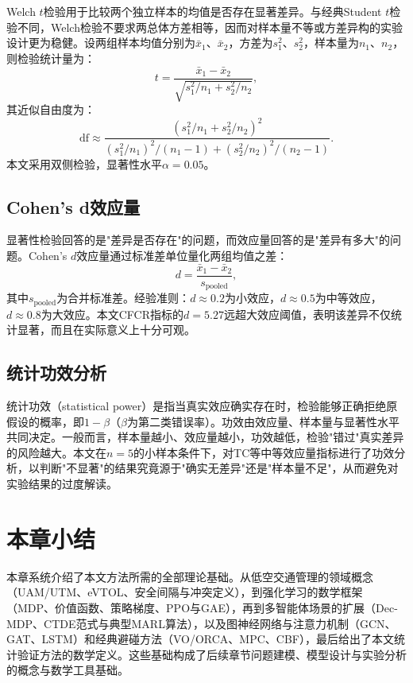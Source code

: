 \documentclass[12pt,a4paper,UTF8]{ctexbook}
\begin{document}
Welch $t$检验\cite{ref42}用于比较两个独立样本的均值是否存在显著差异。与经典Student $t$检验不同，Welch检验不要求两总体方差相等，因而对样本量不等或方差异构的实验设计更为稳健。设两组样本均值分别为$\bar{x}_1$、$\bar{x}_2$，方差为$s_1^2$、$s_2^2$，样本量为$n_1$、$n_2$，则检验统计量为：
\begin{equation}
    t = \frac{\bar{x}_1 - \bar{x}_2}{\sqrt{s_1^2/n_1 + s_2^2/n_2}},
    \label{eq:welch}
\end{equation}
其近似自由度为：
\begin{equation}
    \text{df} \approx \frac{\left(s_1^2/n_1 + s_2^2/n_2\right)^2}{(s_1^2/n_1)^2/(n_1-1) + (s_2^2/n_2)^2/(n_2-1)}.
    \label{eq:welch_df}
\end{equation}
本文采用双侧检验，显著性水平$\alpha=0.05$。

\subsection{Cohen's d效应量}

显著性检验回答的是"差异是否存在"的问题，而效应量回答的是"差异有多大"的问题。Cohen's $d$效应量\cite{ref43}通过标准差单位量化两组均值之差：
\begin{equation}
    d = \frac{\bar{x}_1 - \bar{x}_2}{s_{\text{pooled}}},
    \label{eq:cohen}
\end{equation}
其中$s_{\text{pooled}}$为合并标准差。经验准则：$d\approx0.2$为小效应，$d\approx0.5$为中等效应，$d\approx0.8$为大效应。本文CFCR指标的$d=5.27$远超大效应阈值，表明该差异不仅统计显著，而且在实际意义上十分可观。

\subsection{统计功效分析}

统计功效（statistical power）是指当真实效应确实存在时，检验能够正确拒绝原假设的概率，即$1-\beta$（$\beta$为第二类错误率）。功效由效应量、样本量与显著性水平共同决定。一般而言，样本量越小、效应量越小，功效越低，检验"错过"真实差异的风险越大。本文在$n=5$的小样本条件下，对TC等中等效应量指标进行了功效分析，以判断"不显著"的结果究竟源于"确实无差异"还是"样本量不足"，从而避免对实验结果的过度解读。

\section{本章小结}

本章系统介绍了本文方法所需的全部理论基础。从低空交通管理的领域概念（UAM/UTM、eVTOL、安全间隔与冲突定义），到强化学习的数学框架（MDP、价值函数、策略梯度、PPO与GAE），再到多智能体场景的扩展（Dec-MDP、CTDE范式与典型MARL算法），以及图神经网络与注意力机制（GCN、GAT、LSTM）和经典避碰方法（VO/ORCA、MPC、CBF），最后给出了本文统计验证方法的数学定义。这些基础构成了后续章节问题建模、模型设计与实验分析的概念与数学工具基础。
\end{document}

